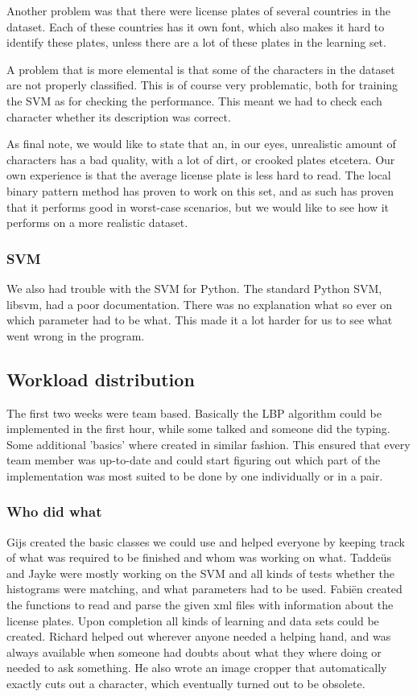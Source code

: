 \documentclass[a4paper]{article}
\begin{document}
Another problem was that there were license plates of several countries in
the dataset. Each of these countries has it own font, which also makes it
hard to identify these plates, unless there are a lot of these plates in the
learning set.

A problem that is more elemental is that some of the characters in the dataset
are not properly classified. This is of course very problematic, both for
training the SVM as for checking the performance. This meant we had to check
each character whether its description was correct.

As final note, we would like to state that an, in our eyes, unrealistic amount
of characters has a bad quality, with a lot of dirt, or crooked plates
etcetera. Our own experience is that the average license plate is less hard to
read. The local binary pattern method has proven to work on this set, and as
such has proven that it performs good in worst-case scenarios, but we would
like to see how it performs on a more realistic dataset.

\subsubsection*{SVM}

We also had trouble with the SVM for Python. The standard Python SVM, libsvm,
had a poor documentation. There was no explanation what so ever on which
parameter had to be what. This made it a lot harder for us to see what went
wrong in the program.

\subsection{Workload distribution}

The first two weeks were team based. Basically the LBP algorithm could be
implemented in the first hour, while some talked and someone did the typing.
Some additional 'basics' where created in similar fashion. This ensured that
every team member was up-to-date and could start figuring out which part of the
implementation was most suited to be done by one individually or in a pair.

\subsubsection*{Who did what}

Gijs created the basic classes we could use and helped everyone by keeping
track of what was required to be finished and whom was working on what.
Tadde\"us and Jayke were mostly working on the SVM and all kinds of tests
whether the histograms were matching, and what parameters had to be used.
Fabi\"en created the functions to read and parse the given xml files with
information about the license plates. Upon completion all kinds of learning
and data sets could be created. Richard helped out wherever anyone needed a
helping hand, and was always available when someone had doubts about what they
where doing or needed to ask something. He also wrote an image cropper that
automatically exactly cuts out a character, which eventually turned out to be
obsolete.
\end{document}
